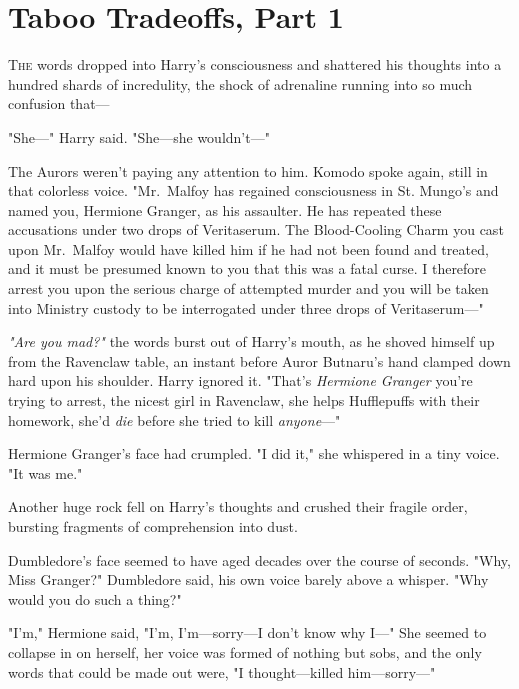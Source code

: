 \chapter{Taboo Tradeoffs, Part 1}

\lettrine{T}{he} words dropped into Harry's consciousness and shattered his thoughts into a
hundred shards of incredulity, the shock of adrenaline running into so much
confusion that---

"She\mbox{---}" Harry said. "She---she wouldn't---"

The Aurors weren't paying any attention to him. Komodo spoke again, still in
that colorless voice. "Mr.~Malfoy has regained consciousness in St. Mungo's and
named you, Hermione Granger, as his assaulter. He has repeated these
accusations under two drops of Veritaserum. The Blood-Cooling Charm you cast
upon Mr.~Malfoy would have killed him if he had not been found and treated, and
it must be presumed known to you that this was a fatal curse. I therefore
arrest you upon the serious charge of attempted murder and you will be taken
into Ministry custody to be interrogated under three drops of Veritaserum\mbox{---}"

\emph{"Are you mad?"} the words burst out of Harry's mouth, as he shoved
himself up from the Ravenclaw table, an instant before Auror Butnaru's hand
clamped down hard upon his shoulder. Harry ignored it. "That's \emph{Hermione
Granger} you're trying to arrest, the nicest girl in Ravenclaw, she helps
Hufflepuffs with their homework, she'd \emph{die} before she tried to kill
\emph{anyone}\mbox{---}"

Hermione Granger's face had crumpled. "I did it," she whispered in a tiny
voice. "It was me."

Another huge rock fell on Harry's thoughts and crushed their fragile order,
bursting fragments of comprehension into dust.

Dumbledore's face seemed to have aged decades over the course of seconds. "Why,
Miss Granger?" Dumbledore said, his own voice barely above a whisper. "Why
would you do such a thing?"

"I'm," Hermione said, "I'm, I'm---sorry---I don't know why I\mbox{---}" She seemed to
collapse in on herself, her voice was formed of nothing but sobs, and the only
words that could be made out were, "I thought---killed him---sorry\mbox{---}"

